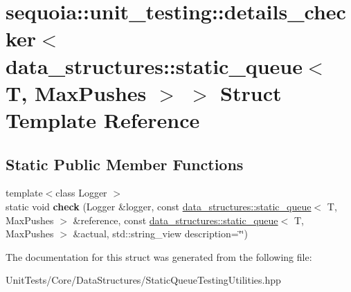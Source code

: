 \hypertarget{structsequoia_1_1unit__testing_1_1details__checker_3_01data__structures_1_1static__queue_3_01_t_00_01_max_pushes_01_4_01_4}{}\section{sequoia\+::unit\+\_\+testing\+::details\+\_\+checker$<$ data\+\_\+structures\+::static\+\_\+queue$<$ T, Max\+Pushes $>$ $>$ Struct Template Reference}
\label{structsequoia_1_1unit__testing_1_1details__checker_3_01data__structures_1_1static__queue_3_01_t_00_01_max_pushes_01_4_01_4}
\subsection*{Static Public Member Functions}
\begin{DoxyCompactItemize}
\item 
\mbox{\label{structsequoia_1_1unit__testing_1_1details__checker_3_01data__structures_1_1static__queue_3_01_t_00_01_max_pushes_01_4_01_4_ac33d4abf68b5a926dcaadda9c3dd6254}} 
{\footnotesize template$<$class Logger $>$ }\\static void {\bfseries check} (Logger \&logger, const \mbox{\hyperlink{classsequoia_1_1data__structures_1_1static__queue}{data\+\_\+structures\+::static\+\_\+queue}}$<$ T, Max\+Pushes $>$ \&reference, const \mbox{\hyperlink{classsequoia_1_1data__structures_1_1static__queue}{data\+\_\+structures\+::static\+\_\+queue}}$<$ T, Max\+Pushes $>$ \&actual, std\+::string\+\_\+view description=\char`\"{}\char`\"{})
\end{DoxyCompactItemize}


The documentation for this struct was generated from the following file\+:\begin{DoxyCompactItemize}
\item 
Unit\+Tests/\+Core/\+Data\+Structures/Static\+Queue\+Testing\+Utilities.\+hpp\end{DoxyCompactItemize}
